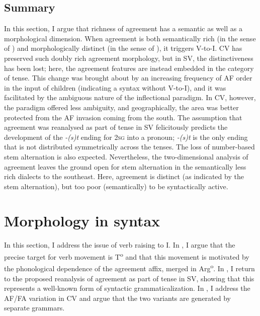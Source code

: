 \documentclass[output=paper,colorlinks,citecolor=brown,draft,draftmode]{langscibook}
\begin{document}
\subsection{Summary}\label{sec:petzell:4.4}


In this section, I argue that richness of agreement has a semantic as well as a morphological dimension. When agreement is both semantically rich (in the sense of \citealt{Tvica2017}) and morphologically distinct (in the sense of \citealt{BobaljikThrainsson1998}), it triggers V-to-I. CV has preserved such doubly rich agreement morphology, but in SV, the distinctiveness has been lost; here, the agreement features are instead embedded in the category of tense. This change was brought about by an increasing frequency of AF order in the input of children (indicating a syntax without V-to-I), and it was facilitated by the ambiguous nature of the inflectional paradigm. In CV, however, the paradigm offered less ambiguity, and geographically, the area was better protected from the AF invasion coming from the south. The assumption that agreement was reanalysed as part of tense in SV felicitously predicts the development of the \textit{-(s)t} ending for 2\textsc{sg} into a pronoun; \textit{-(s)t} is the only ending that is not distributed symmetrically across the tenses. The loss of number-based stem alternation is also expected. Nevertheless, the two-dimensional analysis of agreement leaves the ground open for stem alternation in the semantically less rich dialects to the southeast. Here, agreement is distinct (as indicated by the stem alternation), but too poor (semantically) to be syntactically active.


\section{Morphology in syntax}\label{sec:petzell:5}


In this section, I address the issue of verb raising to I. In , I argue that the precise target for verb movement is T\textsuperscript{o} and that this movement is motivated by the phonological dependence of the agreement affix, merged in Arg\textsuperscript{o}. In , I return to the proposed reanalysis of agreement as part of tense in SV, showing that this represents a well-known form of syntactic grammaticalization. In , I address the AF/FA variation in CV and argue that the two variants are generated by separate grammars.
\end{document}
